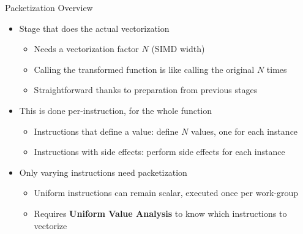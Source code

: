 \begin{frame}{Packetization Overview}

\begin{itemize}
    \item Stage that does the actual vectorization
    \begin{itemize}
        \item Needs a vectorization factor $N$ (SIMD width)
        \item Calling the transformed function is like calling the original $N$ times
        \item Straightforward thanks to preparation from previous stages
    \end{itemize}
    
    \item This is done per-instruction, for the whole function
    \begin{itemize}
        \item Instructions that define a value: define $N$ values, one for each instance
        \item Instructions with side effects: perform side effects for each instance
    \end{itemize}
    
    \item Only varying instructions need packetization
    \begin{itemize}
        \item Uniform instructions can remain scalar, executed once per work-group
        \item Requires \textbf{Uniform Value Analysis} to know which instructions to vectorize
    \end{itemize}
    
\end{itemize}

\end{frame}


